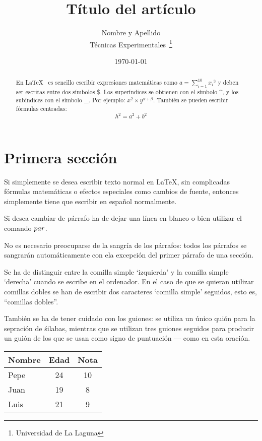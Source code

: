 \documentclass[a4paper,12pt]{article}
\begin{document}
\title{Título del artículo}
\author{Nombre y Apellido \\
	Técnicas Experimentales~\footnote{Universidad de La Laguna}
	}
\date{\today}
\maketitle
\begin{abstract}
  En \LaTeX{}~\cite{Lam:86} es sencillo escribir expresiones
  matemáticas como $a=\sum_{i=1}^{10} {x_i}^{3}$
  y deben ser escritas entre dos símbolos \$.
  Los superíndices se obtienen con el símbolo \^{}, y
  los subíndices con el símbolo \_.
  Por ejemplo: $x^2\times y ^{\alpha + \beta}$.
  También se pueden escribir fórmulas centradas:
  \[h^2=a^2 + b^2 \]
\end{abstract}

\section{Primera sección}
 Si simplemente se desea escribir texto normal en LaTeX,
 sin complicadas f\'ormulas matem\'aticas o efectos especiales
 como cambios de fuente, entonces simplemente tiene que escribir
 en espa\~nol normalmente.\par
 Si desea cambiar de párrafo ha de dejar una línea en blanco o bien
utilizar el comando $\\par$.

 No es necesario preocuparse de la sangría de los párrafos:
 todos los párrafos se sangrarán automáticamente con ela excepción
 del primer párrafo de una sección.
 
 Se ha de distinguir entre la comilla simple `izquierda'
 y la comilla simple `derecha' cuando se escribe en el ordenador.
 En el caso de que se quieran utilizar comillas dobles se han de
 escribir dos caracteres `comilla simple' seguidos, esto es,
 ``comillas dobles''.
 
 También se ha de tener cuidado con los guiones: se utiliza un único
 quión para la sepración de śilabas, mientras que se utilizan
 tres guiones seguidos para producir un guión de los que se usan
 como signo de puntuación --- como en esta oración.
 \bigskip
 \begin{tabular}{|l|c|c|}
  \hline
    Nombre & Edad & Nota \\ \hline
    Pepe   &   24 &   10 \\ \hline
    Juan   &   19 &    8 \\ \hline
    Luis   &   21 &    9 \\ \hline
 \end{tabular}
\end{document}
